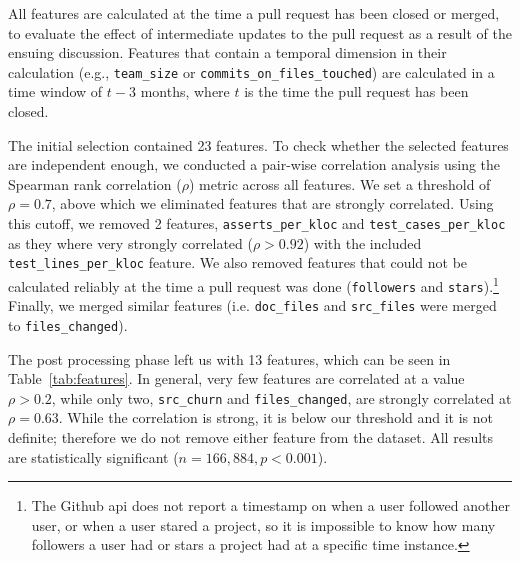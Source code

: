 \documentclass{sig-alternate}
\begin{document}
All features are calculated at the time a pull request has been closed or
merged, to evaluate the effect of intermediate updates to the pull request as a
result of the ensuing discussion. Features that contain a temporal dimension in
their calculation (e.g., \texttt{team\_size} or
\texttt{commits\_on\_files\_touched}) are calculated in a time window of $t - 3$
months, where $t$ is the time the pull request has been closed. 

The initial selection contained 23 features. To check whe\-ther the selected
features are independent enough, we
conducted a pair-wise correlation analysis using the Spearman rank correlation
($\rho$) metric across all features. We set a threshold of $\rho = 0.7$, above
which we eliminated features that are strongly correlated. Using this cutoff, we
removed 2 features, \texttt{asserts\_per\_kloc} and
\texttt{test\_cases\_per\_kloc} as they where very strongly correlated ($\rho >
0.92$) with the included \texttt{test\_lines\_per\_kloc} feature. We also
removed features that could not be calculated reliably at the time a pull
request was done (\texttt{followers} and \texttt{stars}).\footnote{The Github
{\sc api} does not report a timestamp on when a user followed another user, or
when a user stared a project, so it is impossible to know how many followers a
user had or stars a project had at a specific time instance.} Finally, we
merged similar features (i.e. \texttt{doc\_files} and \texttt{src\_files} were merged to \texttt{files\_changed}). 

The post processing phase left us with 13 features, which can be seen in
Table~\ref{tab:features}. 
In general, very few
features are correlated at a value $\rho > 0.2$, while only two,
\texttt{src\_churn} and \texttt{files\_changed}, are strongly correlated at
$\rho = 0.63$. While the correlation is strong, it is below our threshold and it
is not definite; therefore we do not remove either feature from the dataset. All
results are statistically significant ($n = 166,884, p < 0.001$).



\end{document}
